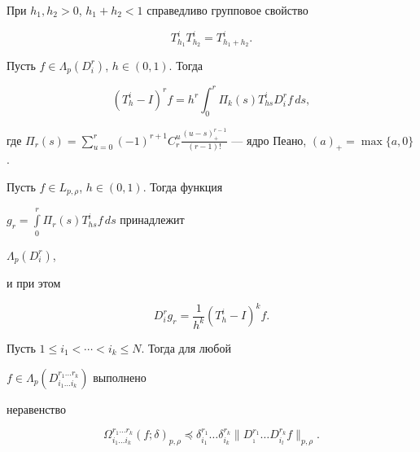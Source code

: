  


\begin{lem} 


При $h_1,h_2>0$, $h_1+h_2<1$ справедливо групповое свойство 


$$ 


T^i_{h_1}T^i_{h_2}=T^i_{h_1+h_2}. 


$$ 


\end{lem} 


 


\begin{lem} 


Пусть $f\in \Lambda_p(D^r_i)$, $h\in (0,1)$. Тогда 


$$ 


(T^i_h-I)^r f=h^r\int^r_0\Pi_k(s) T^i_{h s}D^r_i f\,d s, 


$$ 


где $\Pi_r(s)=\sum\limits^r_{u=0}(-1)^{r+1}C^u_r 


\frac{(u-s)^{r-1}_+}{(r-1)!}$ --- ядро Пеано, $(a)_+=\max\{a,0\}$. 


\end{lem} 


 


\begin{lem} 


Пусть $f\in L_{p,\rho}$, $h\in(0,1)$. Тогда функция 


$g_r=\int\limits^r_0\Pi_r(s)T^i_{h s}f\,d s$ принадлежит 


$\Lambda_p(D^r_i)$, 


и при этом 


$$ 


D^r_i g_r=\frac{1}{h^k}(T^i_h-I)^k f. 


$$ 


\end{lem} 


 


\begin{lem} 


Пусть $1\le i_1<\dotsb<i_k\le N$. Тогда для любой 


$f\in\Lambda_p(D^{r_1\dotsc r_k}_{i_1\dotsc i_k})$ выполнено 


неравенство 


$$ 


\Omega^{r_1\dotsc r_k}_{i_1\dotsc i_k}(f;\delta)_{p,\rho}\preceq 


\delta^{r_1}_{i_1}\dotsc \delta^{r_k}_{i_k} 


\|D^{r_1}_{_1}\dotsc D^{r_k}_{i_l}f\|_{p,\rho}. 


$$ 


\end{lem} 


